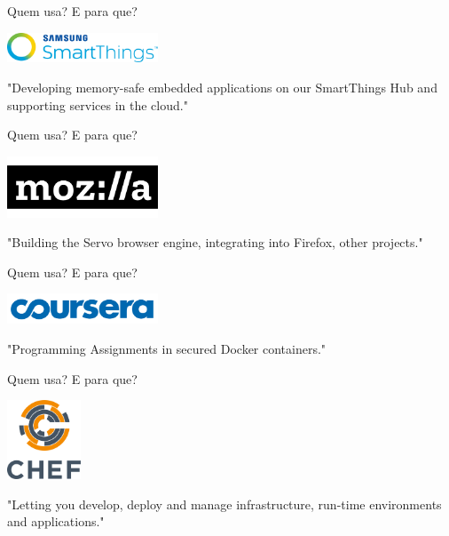 \documentclass[aspectratio=169]{beamer}
\begin{document}
\begin{frame}{Quem usa? E para que?}
	\begin{center}
		\includegraphics[width=4.5cm]{imgs/smartthings.png}	
		
		"Developing memory-safe embedded applications on our SmartThings Hub and supporting services in the cloud."
	\end{center}
\end{frame}

\begin{frame}{Quem usa? E para que?}
	\begin{center}
		\includegraphics[width=4.5cm]{imgs/mozilla.png}	
		
		"Building the Servo browser engine, integrating into Firefox, other projects."
	\end{center}
\end{frame}

\begin{frame}{Quem usa? E para que?}
	\begin{center}
		\includegraphics[width=4.5cm]{imgs/coursera.png}	
		
		"Programming Assignments in secured Docker containers."
	\end{center}
\end{frame}

\begin{frame}{Quem usa? E para que?}
	\begin{center}
		\includegraphics[width=2.2cm]{imgs/chef.png}	
		
		"Letting you develop, deploy and manage infrastructure, run-time environments and applications."
	\end{center}
\end{frame}
\end{document}
